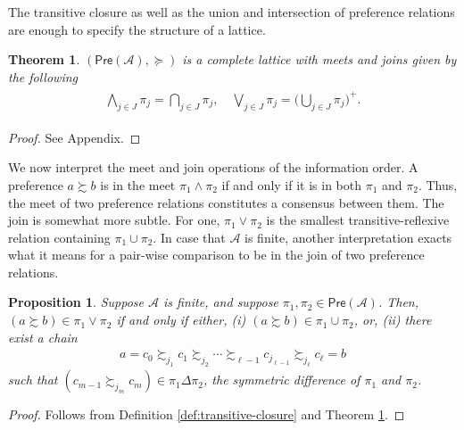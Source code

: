 \documentclass[conference]{ieeeconf}
\renewcommand{\succeq}{\succcurlyeq}
\newcommand{\A}{\mathcal{A}}
\newcommand{\Pref}{\mathsf{Pre}}
\newcommand{\prefers}{\succsim}
\newcommand{\join}{\vee}
\newcommand{\meet}{\wedge}
\newcommand{\bigjoin}{\bigvee}
\newcommand{\bigmeet}{\bigwedge}
\newtheorem{theorem}{Theorem}
\newtheorem{proposition}{Proposition}
\begin{document}
The transitive closure as well as the union and intersection of preference relations are enough to specify the structure of a lattice.

\begin{theorem} \label{thm:complete-lattice}
    $(\Pref(\A), \succeq)$ is a complete lattice with meets and joins given by the following
    \leavevmode
    \begin{align}
    \begin{aligned}
        \bigmeet_{j \in J} \pi_j = \bigcap_{j \in J} \pi_j, \quad 
        \bigjoin_{j \in J} \pi_j= \biggl(\bigcup_{j \in J} \pi_j \biggr)^{+}.
    \end{aligned}\label{eq:meets-joins}
\end{align}
\end{theorem}
\begin{proof}
    See Appendix.
\end{proof}


We now interpret the meet and join operations of the information order. A preference $a \prefers b$ is in the meet $\pi_1 \meet \pi_2$ if and only if it is in both $\pi_1$ and $\pi_2$. Thus, the meet of two preference relations constitutes a consensus between them. The join is somewhat more subtle. For one, $\pi_1 \join \pi_2$ is the smallest transitive-reflexive relation containing $\pi_1 \cup \pi_2$. In case that $\A$ is finite, another interpretation exacts what it means for a pair-wise comparison to be in the join of two preference relations.
\begin{proposition} \label{prop:join}
    Suppose $\A$ is finite, and suppose $\pi_1, \pi_2 \in \Pref(\A)$. Then, $(a \prefers b) \in \pi_1 \join \pi_2$ if and only if either, (i) $(a \prefers b) \in \pi_1 \cup \pi_2$, or, (ii) there exist a chain
    \begin{align}
        a = c_0 \prefers_{j_1} c_1 \prefers_{j_2}  \cdots \prefers_{\ell-1} c_{j_{\ell-1}} \prefers_{j_\ell} c_{\ell} = b \label{eq:chain}
    \end{align}
    such that $\left( c_{m-1} \prefers_{{j_m}} c_{m} \right) \in \pi_1 \Delta \pi_2$, the symmetric difference of $\pi_1$ and $\pi_2$.
\end{proposition}
\begin{proof}
    Follows from Definition \ref{def:transitive-closure} and Theorem \ref{thm:complete-lattice}.
\end{proof}
\end{document}
